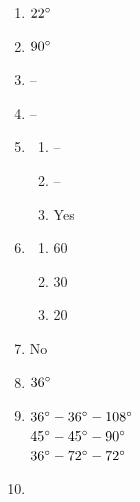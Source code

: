 \documentclass{article}
\begin{document}
\begin{enumerate}
\begin{enumerate}
	\item $\vec{a} + \vec{c}$
	
	\item $-\vec{b} + \vec{c}$
	
	\item $\vec{a} + \vec{b} + \vec{c}$
	
	\item $-\vec{a} + \vec{b} + \vec{c}$
	
	\end{enumerate}
	
\item $22 \degree$

\item $90 \degree$
	
\item --

\item --

\item 

	\begin{enumerate}
	
	\item --
	
	\item --
	
	\item Yes
	
	\end{enumerate}
	
\item

	\begin{enumerate}
	
	\item 60
	
	\item 30
	
	\item 20
	
	\end{enumerate}
	
\item No

\item $36 \degree$

\item $36 \degree - 36 \degree - 108 \degree$ \\
	$45 \degree - 45 \degree - 90 \degree$ \\
	$36 \degree - 72 \degree - 72 \degree$
	
\item


\end{enumerate}
\end{document}
